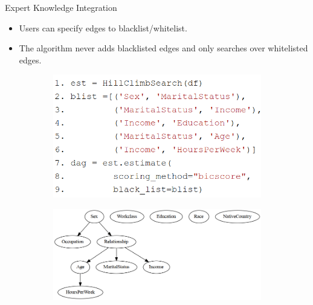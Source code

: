 \documentclass{beamer}
\begin{document}
\begin{frame}{Expert Knowledge Integration}
	\begin{itemize}
		\item Users can specify edges to blacklist/whitelist.
		\item The algorithm never adds blacklisted edges and only
			searches over whitelisted edges.
	\end{itemize}
	\begin{figure}
		\begin{subfigure}{0.5 \textwidth}
			\centering
			\includegraphics[scale=0.28]{imgs/adult_blacklist.png}
		\end{subfigure}%
		\begin{subfigure}{0.5 \textwidth}
			\centering
			\includegraphics[scale=0.3]{imgs/adult_bic_blacklist.png}
		\end{subfigure}
	\end{figure}
\end{frame}
\end{document}
